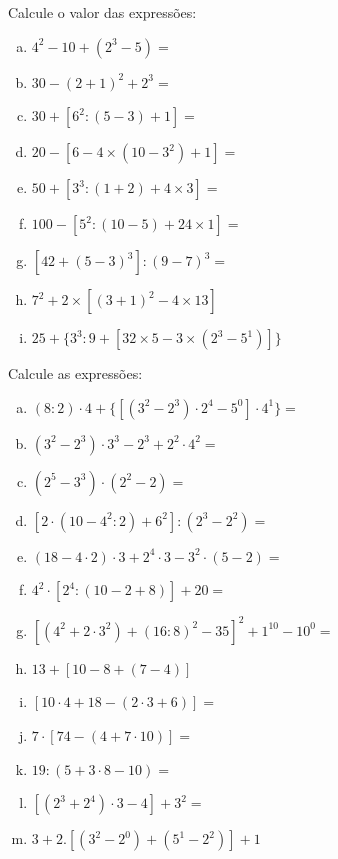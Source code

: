 \item Calcule o valor das expressões:
\begin{multicols}{2}
\begin{enumerate}[a)]
	\item $4^2- 10 + (2^3 - 5) =$
	\item $30 - (2 + 1)^2+ 2^3 =$
	\item $30 + [6^2 : ( 5 - 3) + 1 ] =$
	\item $20 - [6 - 4 \times( 10 - 3^2) + 1] =$
	\item $50 + [ 3^3 : ( 1 + 2) + 4 \times 3] =$
	\item $100 -[ 5^2 : (10 - 5 ) + 24 \times 1 ] =$
	\item $[ 42 + ( 5 - 3)^3] : ( 9 - 7)^3 =$
	\item $7^2+ 2 \times[(3 + 1)^2 - 4 \times 13] $
	\item $25 + \{ 3^3 : 9 +[ 32 \times 5 - 3 \times (2^3- 5^1)]\} $
\end{enumerate}
\end{multicols}

\item Calcule as expressões:
\begin{multicols}{2}
\begin{enumerate}[a)]
	\item $( 8 : 2) \cdot 4 + \{[(3^2 - 2^3) \cdot 2^4 - 5^0] \cdot 4^1\}=$
	\item $( 3^2 - 2^3) \cdot 3^3 - 2^3 + 2^2 \cdot 4^2 =$
	\item $( 2^5 - 3^3) \cdot (2^2 - 2 ) = $
	\item $[2 \cdot (10 - 4^2 : 2) + 6^2] : ( 2^3 - 2^2) =$
	\item $(18 - 4 \cdot 2) \cdot 3 + 2^4 \cdot 3 - 3^2 \cdot ( 5 - 2) =$
	\item $4^2 \cdot [2^4 : ( 10 - 2 + 8 ) ] + 20 =$
	\item $[( 4^2 + 2 \cdot 3^2) + ( 16 : 8)^2 - 35]^2 + 1^{10} - 10^0 =$
	\item $13 + [ 10 - 8 + (7 - 4)] $
	\item $[10 \cdot 4 + 18 - ( 2 \cdot 3 +6)] =$
	\item $7 \cdot [ 74 - ( 4 + 7 \cdot 10)] =$
	\item $19 : ( 5 + 3 \cdot 8 - 10) =$
	\item $[( 2^3 + 2^4) \cdot 3 -4] + 3^2 =$
	\item $3 + 2 . [(3^2- 2^0) + ( 5^1 - 2^2)] + 1 $
\end{enumerate}
\end{multicols}

